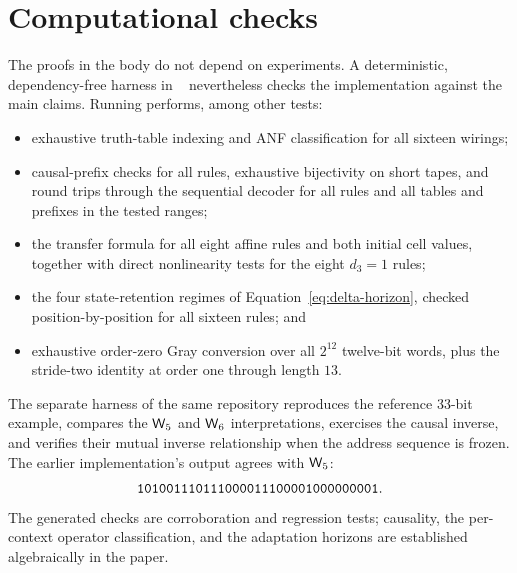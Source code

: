 \section{Computational checks}\label{sec:verification-new}

The proofs in the body do not depend on experiments.  A deterministic, dependency-free harness
in ~\cite{cxorrepo} nevertheless checks the implementation against the main
claims.  Running
 performs, among other tests:
\begin{itemize}
  \item exhaustive truth-table indexing and ANF classification for all sixteen wirings;
  \item causal-prefix checks for all rules, exhaustive bijectivity on short tapes, and round trips
        through the sequential decoder for all rules and all tables and prefixes in the tested
        ranges;
  \item the transfer formula for all eight affine rules and both initial cell values, together
        with direct nonlinearity tests for the eight $d_3=1$ rules;
  \item the four state-retention regimes of Equation~\eqref{eq:delta-horizon}, checked
        position-by-position for all sixteen rules; and
  \item exhaustive order-zero Gray conversion over all $2^{12}$ twelve-bit words, plus the
        stride-two identity at order one through length $13$.
\end{itemize}

The separate  harness of the same repository reproduces the reference 33-bit example, compares the
$\mathsf{W}_{5}$ and $\mathsf{W}_{6}$ interpretations, exercises the causal inverse, and verifies their mutual inverse
relationship when the address sequence is frozen.  The earlier implementation's output agrees with $\mathsf{W}_{5}$:
\[
\text{\texttt{101001110111000011100001000000001}}.
\]
The generated checks are corroboration and regression tests; causality, the per-context operator
classification, and the adaptation horizons are established algebraically in the paper.
